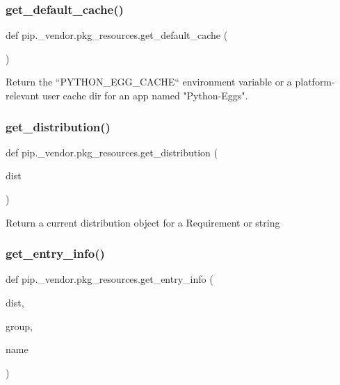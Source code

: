 \subsubsection{\texorpdfstring{get\+\_\+default\+\_\+cache()}{get\_default\_cache()}}
{\footnotesize\ttfamily def pip.\+\_\+vendor.\+pkg\+\_\+resources.\+get\+\_\+default\+\_\+cache (\begin{DoxyParamCaption}{ }\end{DoxyParamCaption})}

\begin{DoxyVerb}Return the ``PYTHON_EGG_CACHE`` environment variable
or a platform-relevant user cache dir for an app
named "Python-Eggs".
\end{DoxyVerb}
 \mbox{\label{namespacepip_1_1__vendor_1_1pkg__resources_a66b83328f396096391076c94d6d4cf89}} 
\subsubsection{\texorpdfstring{get\+\_\+distribution()}{get\_distribution()}}
{\footnotesize\ttfamily def pip.\+\_\+vendor.\+pkg\+\_\+resources.\+get\+\_\+distribution (\begin{DoxyParamCaption}\item[{}]{dist }\end{DoxyParamCaption})}

\begin{DoxyVerb}Return a current distribution object for a Requirement or string\end{DoxyVerb}
 \mbox{\label{namespacepip_1_1__vendor_1_1pkg__resources_abf954cc52f4f05a1e1e424362061569b}} 
\subsubsection{\texorpdfstring{get\+\_\+entry\+\_\+info()}{get\_entry\_info()}}
{\footnotesize\ttfamily def pip.\+\_\+vendor.\+pkg\+\_\+resources.\+get\+\_\+entry\+\_\+info (\begin{DoxyParamCaption}\item[{}]{dist,  }\item[{}]{group,  }\item[{}]{name }\end{DoxyParamCaption})}

